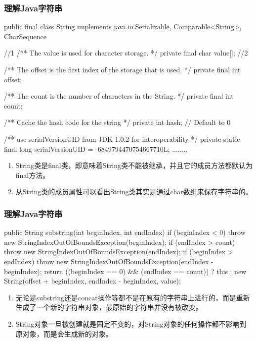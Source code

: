 \begin{frame}[fragile]
  \frametitle{理解Java字符串}

  \begin{javaCode}
    public final class String
    implements java.io.Serializable, Comparable<String>, CharSequence { //1
    /** The value is used for character storage. */
    private final char value[]; //2

    /** The offset is the first index of the storage that is used. */
    private final int offset;

    /** The count is the number of characters in the String. */
    private final int count;

    /** Cache the hash code for the string */
    private int hash; // Default to 0

    /** use serialVersionUID from JDK 1.0.2 for interoperability */
    private static final long serialVersionUID = -6849794470754667710L;
    ........
}
  \end{javaCode}

  \begin{enumerate}\kai\small
  \item String类是final类，即意味着String类不能被继承，并且它的成员方法都默认为final方法。
  \item 从String类的成员属性可以看出String类其实是通过char数组来保存字符串的。
  \end{enumerate}
\end{frame}


\begin{frame}[fragile]
  \frametitle{理解Java字符串}

  \begin{javaCode}
    public String substring(int beginIndex, int endIndex) {
      if (beginIndex < 0) {
        throw new StringIndexOutOfBoundsException(beginIndex);
      }
      if (endIndex > count) {
        throw new StringIndexOutOfBoundsException(endIndex);
      }
      if (beginIndex > endIndex) {
        throw new StringIndexOutOfBoundsException(endIndex - beginIndex);
      }
      return ((beginIndex == 0) && (endIndex == count)) ? this :
      new String(offset + beginIndex, endIndex - beginIndex, value);
    }
  \end{javaCode}

  \begin{enumerate}\kai\small
  \item 无论是substring还是concat操作等都不是在原有的字符串上进行的，而是重新生成了一个新的字符串对象，最原始的字符串并没有被改变。
  \item {\hei\Red String对象一旦被创建就是固定不变的，对String对象的任何操作都不影响到原对象，而是会生成新的对象。}
  \end{enumerate}
\end{frame}


